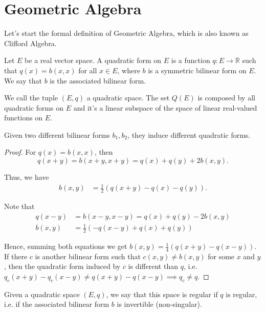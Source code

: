 \section{Geometric Algebra}

Let's start the formal definition of Geometric Algebra, which is also known as
Clifford Algebra.

\begin{definition}
	Let $E$ be a real vector space. A quadratic
	form on $E$ is a function $q:E \to \mathbb R$
	such that $q(x) = b(x,x)$ for all $x \in E$,
	where $b$ is a symmetric bilinear form on $E$.
	We say that $b$ is the associated bilinear form.

	We call the tuple $(E,q)$ a quadratic space.
	The set $Q(E)$ is composed by all quadratic forms on $E$
	and it's a linear subspace of the space of linear real-valued
	functions on $E$.
\end{definition}

\begin{proposition}
	Given two different bilinear forms $b_1, b_2$, they induce
	different quadratic forms.
\end{proposition}
\begin{proof}
	For $q(x) = b(x,x)$, then
	\begin{displaymath}
		q(x+y) = b(x+y,x+y) = q(x) + q(y) + 2b(x,y).
	\end{displaymath}

	Thus, we have
	\begin{align*}
		b(x,y) & = \frac{1}{2} \left(
		q(x+y) - q(x) - q(y)
		\right).
	\end{align*}

	Note that
	\begin{align*}
		q(x-y) & = b(x-y,x-y) = q(x) + q(y) - 2b(x,y) \\
		b(x,y) & = \frac{1}{2} \left(
		-q(x-y) + q(x) + q(y)
		\right)
	\end{align*}

	Hence, summing both equations we get
	$b(x,y) = \frac{1}{4}(q(x+y) - q(x-y))$.
	If there $c$ is another bilinear form such that
	$c(x,y) \neq b(x,y)$ for some $x$ and $y$, then
	the quadratic form induced by $c$ is different than $q$, i.e.
	$q_c(x+y) - q_c(x-y) \neq q(x+y) - q(x-y) \implies q_c \neq q$.
\end{proof}

\begin{definition}
	Given a quadratic space $(E, q)$, we say that this space
	is regular if $q$ is regular, i.e. if the associated bilinear form $b$
	is invertible (non-singular).
\end{definition}

